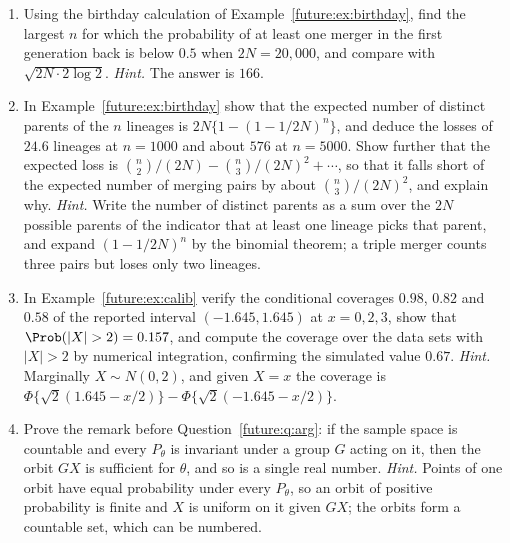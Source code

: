 \begin{enumerate}[label=\arabic*.,ref=\arabic*,leftmargin=*]
\item Using the birthday calculation of Example~\ref{future:ex:birthday}, find the largest $n$ for
which the probability of at least one merger in the first generation back is below $0.5$ when
$2N=20{,}000$, and compare with $\sqrt{2N\cdot2\log2}$. \emph{Hint.} The answer is $166$.

\item In Example~\ref{future:ex:birthday} show that the expected number of distinct parents of the
$n$ lineages is $2N\{1-(1-1/2N)^n\}$, and deduce the losses of $24.6$ lineages at $n=1000$ and
about $576$ at $n=5000$. Show further that the expected loss is
$\binom n2/(2N)-\binom n3/(2N)^2+\cdots$, so that it falls short of the expected number of merging
pairs by about $\binom n3/(2N)^2$, and explain why. \emph{Hint.} Write the number of distinct
parents as a sum over the $2N$ possible parents of the indicator that at least one lineage picks
that parent, and expand $(1-1/2N)^n$ by the binomial theorem; a triple merger counts three pairs
but loses only two lineages.

\item In Example~\ref{future:ex:calib} verify the conditional coverages $0.98$, $0.82$ and $0.58$
of the reported interval $(-1.645,1.645)$ at $x=0,2,3$, show that $\Prob(|X|>2)=0.157$, and
compute the coverage over the data sets with $|X|>2$ by numerical integration, confirming the
simulated value $0.67$. \emph{Hint.} Marginally $X\sim N(0,2)$, and given $X=x$ the coverage is
$\Phi\{\sqrt2(1.645-x/2)\}-\Phi\{\sqrt2(-1.645-x/2)\}$.

\item Prove the remark before Question~\ref{future:q:arg}: if the sample space is countable and
every $P_\theta$ is invariant under a group $G$ acting on it, then the orbit $GX$ is sufficient
for $\theta$, and so is a single real number. \emph{Hint.} Points of one orbit have equal
probability under every $P_\theta$, so an orbit of positive probability is finite and $X$ is
uniform on it given $GX$; the orbits form a countable set, which can be numbered.


\end{enumerate}

